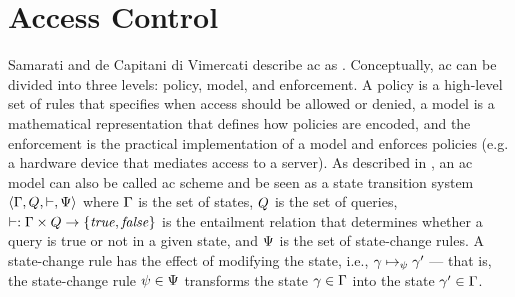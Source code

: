 \section{Access Control}
\label{sec:background.access_control}

Samarati and de Capitani di Vimercati \cite{ac_desc} describe \gls{ac} as . Conceptually, \gls{ac} can be divided into three levels: policy, model, and enforcement. 
A policy is a high-level set of rules that specifies when access should be allowed or denied, a model is a mathematical representation that defines how policies are encoded, and the enforcement is the practical implementation of a model and enforces policies (e.g. a hardware device that mediates access to a server).
As described in \cite{ac_model}, an \gls{ac} model can also be called \gls{ac} scheme and be seen as a state transition system \( \langle \Gamma, Q, \vdash, \Psi \rangle \) where \( \Gamma \) is the set of states, \( Q \) is the set of queries, \( \vdash: \Gamma \times Q \to \lbrace \mathit{true}, \mathit{false} \rbrace \) is the entailment relation that determines whether a query is true or not in a given state, and \( \Psi \) is the set of state-change rules. A state-change rule has the effect of modifying the state, i.e., \( \gamma \mapsto_{\psi} \gamma' \) --- that is, the state-change rule \(\psi \in \Psi\) transforms the state \( \gamma \in \Gamma \) into the state \( \gamma' \in \Gamma\).

